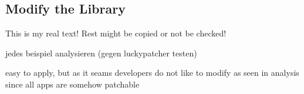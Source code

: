 \subsection{Modify the Library} \label{subsection:evaluation-modifications-library}
This is my real text! Rest might be copied or not be checked!

jedes beispiel analysieren (gegen luckypatcher testen)


easy to apply, but as it seams developers do not like to modify as seen in analysis since all apps are somehow patchable
